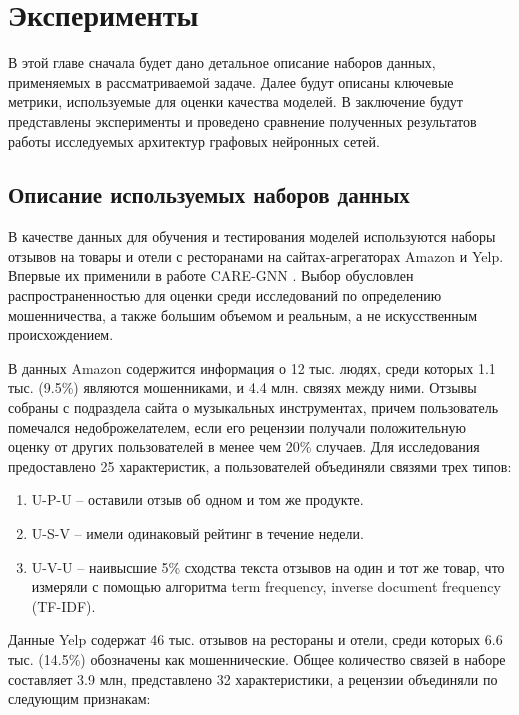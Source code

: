 \section{Эксперименты}

В этой главе сначала будет дано детальное описание наборов данных, применяемых в рассматриваемой задаче. Далее будут описаны ключевые метрики, используемые для оценки качества моделей. В заключение будут представлены эксперименты и проведено сравнение полученных результатов работы исследуемых архитектур графовых нейронных сетей.

\subsection{Описание используемых наборов данных}

В качестве данных для обучения и тестирования моделей используются наборы отзывов на товары и отели с ресторанами на сайтах-агрегаторах Amazon и Yelp. Впервые их применили в работе CARE-GNN \cite{dou2020}. Выбор обусловлен распространенностью для оценки среди исследований по определению мошенничества, а также большим объемом и реальным, а не искусственным происхождением.

В данных Amazon содержится информация о 12 тыс. людях, среди которых 1.1 тыс. (9.5\%) являются мошенниками, и 4.4 млн. связях между ними. Отзывы собраны с подраздела сайта о музыкальных инструментах, причем пользователь помечался недоброжелателем, если его рецензии получали положительную оценку от других пользователей в менее чем 20\% случаев. Для исследования предоставлено 25 характеристик, а пользователей объединяли связями трех типов:

\begin{enumerate}
    \item U-P-U -- оставили отзыв об одном и том же продукте.

    \item U-S-V -- имели одинаковый рейтинг в течение недели.

    \item U-V-U -- наивысшие 5\% сходства текста отзывов на один и тот же товар, что измеряли с помощью алгоритма term frequency, inverse document frequency (TF-IDF).
\end{enumerate}

Данные Yelp содержат 46 тыс. отзывов на рестораны и отели, среди которых 6.6 тыс. (14.5\%) обозначены как мошеннические. Общее количество связей в наборе составляет 3.9 млн, представлено 32 характеристики, а рецензии объединяли по следующим признакам:


